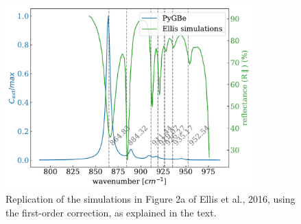 \begin{figure}
    \centering
    \includegraphics[width=0.85\textwidth]{replication_FOA_fig2a_Ellis.pdf} 
    \caption{Replication of the simulations in Figure 2a of Ellis et al., 2016, using the first-order correction, as explained in the text.}
    \label{fig:rep_2a}
 \end{figure}


